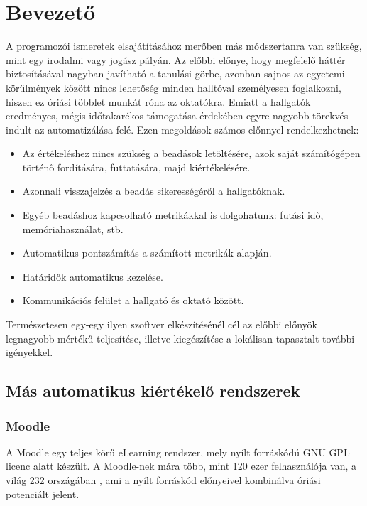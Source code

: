 \chapter*{Bevezető}

A programozói ismeretek elsajátításához merőben más módszertanra van szükség, mint egy irodalmi vagy jogász pályán. Az előbbi előnye, hogy megfelelő háttér biztosításával nagyban javítható a tanulási görbe, azonban sajnos az egyetemi körülmények között nincs lehetőség minden halltóval személyesen foglalkozni, hiszen ez óriási többlet munkát róna az oktatókra. Emiatt a hallgatók eredményes, mégis időtakarékos támogatása érdekében egyre nagyobb törekvés indult az automatizálása felé. Ezen megoldások számos előnnyel rendelkezhetnek:

\begin{itemize}
    \item Az értékeléshez nincs szükség a beadások letöltésére, azok saját számítógépen történő fordítására, futtatására, majd kiértékelésére.
    \item Azonnali visszajelzés a beadás sikerességéről a hallgatóknak.
    \item Egyéb beadáshoz kapcsolható metrikákkal is dolgohatunk: futási idő, memóriahasználat, stb.
    \item Automatikus pontszámítás a számított metrikák alapján.
    \item Határidők automatikus kezelése.
    \item Kommunikációs felület a hallgató és oktató között.
\end{itemize}

Természetesen egy-egy ilyen szoftver elkészítésénél cél az előbbi előnyök legnagyobb mértékű teljesítése, illetve kiegészítése a lokálisan tapasztalt további igényekkel.

\section*{Más automatikus kiértékelő rendszerek}

\subsection*{Moodle}
A Moodle \cite{Moodle} egy teljes körű eLearning rendszer, mely nyílt forráskódú GNU GPL \cite{GNUGPL} licenc alatt készült. A Moodle-nek mára több, mint 120 ezer felhasználója van, a világ 232 országában \cite{MoodleStats}, ami a nyílt forráskód előnyeivel kombinálva óriási potenciált jelent. 

